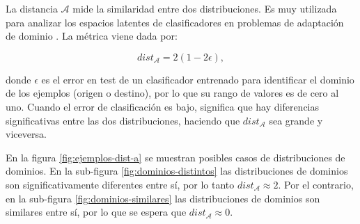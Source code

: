 La distancia $\mathcal{A}$ mide la similaridad entre dos distribuciones. Es muy utilizada para analizar los espacios
latentes de clasificadores en problemas de adaptación de dominio \parencite{ben2006analysis}. La métrica viene dada por:

\begin{equation}
    dist_\mathcal{A} = 2 (1-2\epsilon),
\end{equation}

\noindent
donde $\epsilon$ es el error en test de un clasificador entrenado para identificar el dominio de los ejemplos (origen o destino), por lo que su rango de valores es de cero al uno.
Cuando el error de clasificación es bajo, significa que hay diferencias significativas entre las dos distribuciones,
haciendo que $dist_\mathcal{A}$ sea grande y viceversa.

En la figura \ref{fig:ejemplos-dist-a} se muestran posibles casos de distribuciones de dominios. En la sub-figura
\ref{fig:dominios-distintos} las distribuciones de dominios son significativamente diferentes entre sí, por lo tanto
$dist_\mathcal{A} \approx 2$. Por el contrario, en la sub-figura \ref{fig:dominios-similares} las distribuciones de
dominios son similares entre sí, por lo que se espera que $dist_\mathcal{A} \approx 0$.

